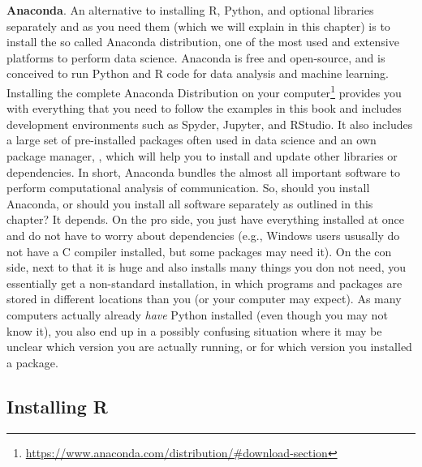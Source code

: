 \begin{feature}\textbf{Anaconda}. An alternative to installing 
  R, Python, and optional libraries separately and as you need them
  (which we will explain in this chapter) is to install the so called
  Anaconda distribution, one of the most used and extensive platforms
  to perform data science. Anaconda is free and open-source, and is
  conceived to run Python and R code for data analysis and machine
  learning. Installing the complete Anaconda Distribution on your
  computer\footnote{\url{https://www.anaconda.com/distribution/\#download-section}}
  provides you with everything that you need to follow the examples in
  this book and includes development environments such as Spyder,
  Jupyter, and RStudio. It also includes a large set of pre-installed
  packages often used in data science and an own package manager,
  , which will help you to install and update other
  libraries or dependencies. In short, Anaconda bundles the almost all
  important software to perform computational analysis of
  communication.  So, should you install Anaconda, or should you
  install all software separately as outlined in this chapter? It
  depends. On the pro side, you just have everything installed at once and do
  not have to worry about dependencies (e.g., Windows users ususally
  do not have a C compiler installed, but some packages may need
  it). On the con side, next to that it is huge and also installs many
  things you don not need, you essentially get a non-standard
  installation, in which programs and packages are stored in different
  locations than you (or your computer may expect).  As many computers
  actually already \emph{have} Python installed (even though you may
  not know it), you also end up in a possibly confusing situation
  where it may be unclear which version you are actually running, or
  for which version you installed a package.
\end{feature}



\subsection{Installing R}

